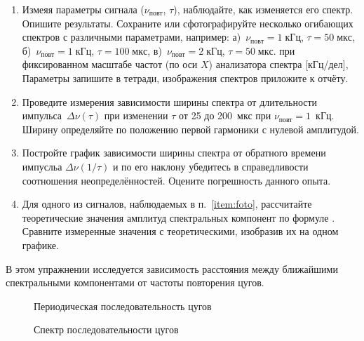 \begin{lab:task}
\begin{enumerate}
\item\label{item:foto} Измеяя параметры сигнала ($\nu_{повт}$, $\tau$),
наблюдайте, как изменяется его спектр. Опишите результаты.
Сохраните или сфотографируйте несколько огибающих спектров с различными
параметрами, например:
а)~$\nu_{повт}=1\;кГц$, $\tau=50\;мкс$,
б)~$\nu_{повт}=1\;кГц$, $\tau=100\;мкс$,
в)~$\nu_{повт}=2\;кГц$, $\tau=50\;мкс$.
при фиксированном масштабе частот (по оси $X$) анализатора спектра [кГц/дел],
Параметры запишите в тетради, изображения спектров приложите к отчёту.

\item Проведите измерения зависимости ширины спектра от длительности
импульса~$\Delta \nu(\tau)$ при изменении $\tau$ от 25 до 200~мкс при
$\nu_\text{повт}=1$~кГц. Ширину определяйте по положению первой гармоники
с нулевой амплитудой.

\item Постройте график зависимости ширины спектра от обратного времени импусльа
$\Delta \nu(1/\tau)$ и по его наклону убедитесь в справедливости соотношения
неопределённостей. Оцените погрешность данного опыта.

\item Для одного из сигналов, наблюдаемых в п.~\ref{item:foto}, рассчитайте теоретические
значения амплитуд спектральных компонент по формуле .
Сравните измеренные значения с теоретическими, изобразив их на одном графике.

\end{enumerate}


В этом упражнении исследуется зависимость расстояния между ближайшими
спектральными компонентами от частоты повторения цугов.

\begin{figure}[h!]
\hfil\hfil
\begin{minipage}{0.4\textwidth}
    \caption{Периодическая последовательность цугов}
\end{minipage}
\hfil
\begin{minipage}{0.4\textwidth}
    \caption{Спектр последовательности цугов}
\end{minipage}
\end{figure}


\begin{enumerate}


\end{enumerate}
\end{lab:task}
